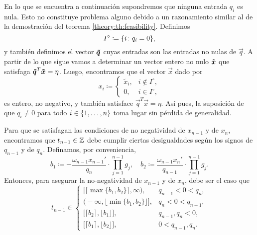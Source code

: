 En lo que se encuentra a continuación supondremos que ninguna entrada $q_i$ es nula. Esto no
constituye problema alguno debido a un razonamiento similar al de la demostración del teorema
\ref{theory:th:feasibility}. Definimos
\begin{equation*}
	I^\circ \coloneq \lbrace i \colon q_i = 0 \rbrace,
\end{equation*}
y también definimos el vector $\boldsymbol{\tilde{q}}$ cuyas entradas son las entradas no nulas de
$\vec{q}$. A partir de lo que sigue vamos a determinar un vector entero no nulo $\boldsymbol{\tilde{x}}$
que satisfaga $\boldsymbol{\tilde{q}}^T\boldsymbol{\tilde{x}} = \eta$. Luego, encontramos que el vector $\vec{x}$
dado por
\begin{equation*}
	x_i \coloneq
	\begin{cases}
		\tilde{x}_i, & i \not \in I^\circ, \\
		0, & i \in I^\circ,
	\end{cases}
\end{equation*}
es entero, no negativo, y también satisface $\vec{q}^T\vec{x} = \eta$. Así pues, la suposición de
que $q_i \neq 0$ para todo $i \in \lbrace 1, \ldots, n \rbrace$ toma lugar sin pérdida de generalidad.

Para que se satisfagan las condiciones de no negatividad de $x_{n-1}$ y de $x_n$, encontramos que
$t_{n-1} \in \mathbb{Z}$ debe cumplir ciertas desigualdades según los signos de $q_{n-1}$ y de $q_n$.
Definamos, por conveniencia,
\begin{equation}
	\label{eq:lr-bounds}
	b_1 \coloneq -\frac{\omega_{n-1}x_{n-1}'}{q_n} \cdot \prod_{j=1}^{n-1}g_j, \quad
	b_2 \coloneq \frac{\omega_{n-1}x_{n}'}{q_{n-1}} \cdot \prod_{j=1}^{n-1}g_j.
\end{equation}
Entonces, para asegurar la no-negatividad de $x_{n - 1}$ y de $x_n$, debe ser el caso que
\begin{equation}
	\label{eq:feasible-param}
	t_{n-1} \in 
	\begin{cases}
		\big[ \lceil \max\lbrace b_1 ,  b_2 \rbrace \rceil, \infty \big), &  q_{n-1} < 0 < q_n, \\[0.5em]
		\big( -\infty, \lfloor \min\lbrace b_1, b_2\rbrace \rfloor \big], &  q_n < 0 < q_{n-1}, \\[0.5em]
		\big[ \lceil b_2 \rceil, \lfloor b_1 \rfloor \big], &  q_{n-1}, q_n < 0, \\[0.5em]
		\big[ \lceil b_1 \rceil, \lfloor b_2 \rfloor \big], &  0 < q_{n-1}, q_n.
	\end{cases}
\end{equation}

